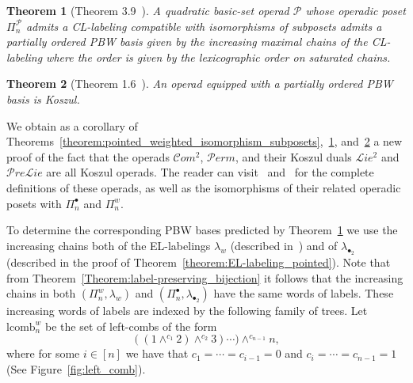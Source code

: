 \documentclass[11pt]{article}
\newtheorem{theo}{Theorem}[section]
\theoremstyle{definition}
\numberwithin{equation}{section}
\newcommand{\OP}{\mathcal{P}}
\newcommand{\Perm}{\mathcal{P}erm}
\newcommand{\Com}{\mathcal{C}om}
\newcommand{\Prelie}{\mathcal{P}re\mathcal{L}ie}
\newcommand{\Lie}{\mathcal{L}ie}
\begin{document}
 \begin{theo}[Theorem 3.9~\cite{BelliermillesDelcroixogerHoffbeck2021}]\label{theorem:BDH_CL_PBW} A quadratic basic-set operad $\OP$ whose operadic poset $\Pi^{\OP}_n$ admits a CL-labeling compatible with isomorphisms of subposets admits a partially ordered PBW basis given by the increasing maximal chains of the CL-labeling where the order is given by the lexicographic order on saturated chains.
 \end{theo}

  \begin{theo}[Theorem 1.6~\cite{BelliermillesDelcroixogerHoffbeck2021}]\label{theorem:BDH_PBW_Koszul} An operad equipped with a partially ordered PBW basis is Koszul.
 \end{theo}

 We obtain as a corollary of Theorems~\ref{theorem:pointed_weighted_isomorphism_subposets},~\ref{theorem:BDH_CL_PBW}, and~\ref{theorem:BDH_PBW_Koszul} a new proof of the fact that the operads $\Com^2$, $\Perm$, and their Koszul duals $\Lie^2$ and $\Prelie$ are all Koszul operads. 
The reader can visit~\cite{ChapotonVallete2006} and~\cite{DotsenkoKhoroshkin2007} for the complete definitions of these operads, as well as the isomorphisms of their related operadic posets with $\Pi_n^{\bullet}$ and $\Pi_n^w$.

 

To determine the corresponding PBW bases predicted by Theorem~\ref{theorem:BDH_CL_PBW} we use the increasing chains both of the EL-labelings $\lambda_{w}$  (described in~\cite[Theorem 3.2]{GonzalezDleonWachs2016}) and of  $\lambda_{\bullet_2}$  (described in the proof of Theorem~\ref{theorem:EL-labeling_pointed}). Note that from Theorem~\ref{Theorem:label-preserving_bijection} it follows that the increasing chains in both $(\Pi_n^w,\lambda_w)$ and $(\Pi_n^{\bullet},\lambda_{\bullet_2})$ have the same words of labels. These increasing words of labels are indexed by the following family of trees. Let $\mathrm{lcomb}_{n}^{w}$ be the set of left-combs of the form
 $$((1\wedge^{c_1} 2)\wedge^{c_2} 3)\cdots ) \wedge^{c_{n-1}} n,$$
 where for some $i\in [n]$ we have that $c_1=\cdots =c_{i-1}=0$  and $c_i=\cdots =c_{n-1}=1$ (See Figure~\ref{fig:left_comb}).
\end{document}
